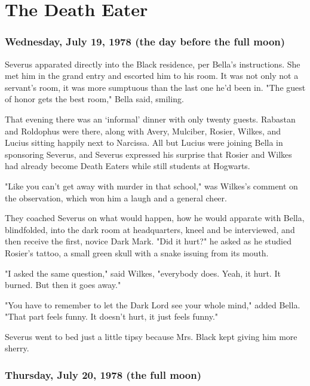 
\chapter{The Death Eater}

\subsection{Wednesday, July 19, 1978 (the day before the full moon)}

Severus apparated directly into the Black residence, per Bella's instructions. She met him in the grand entry and escorted him to his room. It was not only not a servant's room, it was more sumptuous than the last one he'd been in. "The guest of honor gets the best room," Bella said, smiling.

That evening there was an `informal' dinner with only twenty guests. Rabastan and Roldophus were there, along with Avery, Mulciber, Rosier, Wilkes, and Lucius sitting happily next to Narcissa. All but Lucius were joining Bella in sponsoring Severus, and Severus expressed his surprise that Rosier and Wilkes had already become Death Eaters while still students at Hogwarts.

"Like you can't get away with murder in that school," was Wilkes's comment on the observation, which won him a laugh and a general cheer.

They coached Severus on what would happen, how he would apparate with Bella, blindfolded, into the dark room at headquarters, kneel and be interviewed, and then receive the first, novice Dark Mark. "Did it hurt?" he asked as he studied Rosier's tattoo, a small green skull with a snake issuing from its mouth.

"I asked the same question," said Wilkes, "everybody does. Yeah, it hurt. It burned. But then it goes away."

"You have to remember to let the Dark Lord see your whole mind," added Bella. "That part feels funny. It doesn't hurt, it just feels funny."

Severus went to bed just a little tipsy because Mrs. Black kept giving him more sherry.

\subsection{Thursday, July 20, 1978 (the full moon)}

